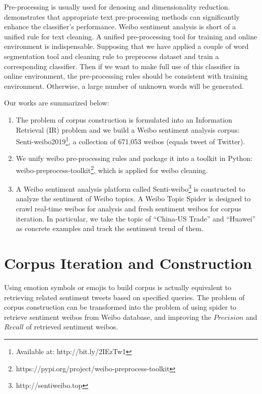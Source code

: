 \documentclass[runningheads]{llncs}
\begin{document}
Pre-processing is usually used for denosing and dimensionality reduction. \cite{haddi2013role} demonstrates that appropriate text pre-processing methods can significantly enhance the classifier's performance. Weibo sentiment analysis is short of a unified rule for text cleaning. A unified pre-processing tool for training and online environment is indispensable. Supposing that we have applied a couple of word segmentation tool and cleaning rule to preprocess dataset and train a corresponding classifier. Then if we want to make full use of this classifier in online environment, the pre-processing rules should be consistent with training environment. Otherwise, a large number of unknown words will be generated.

Our works are summarized below:
\begin{enumerate}
\item The problem of corpus construction is formulated into an Information Retrieval (IR) problem and we build a Weibo sentiment analysis corpus: Senti-weibo2019\footnote{Available at: http://bit.ly/2IEzTw1}, a collection of 671,053 weibos (equals tweet of Twitter).

\item We unify weibo pre-processing rules and package it into a toolkit in Python: weibo-preprocess-toolkit\footnote{https://pypi.org/project/weibo-preprocess-toolkit}, which is applied for weibo cleaning. 

\item A Weibo sentiment analysis platform called Senti-weibo\footnote{http://sentiweibo.top} is constructed to analyze the sentiment of Weibo topics. A Weibo Topic Spider is designed to crawl real-time weibos for analysis and fresh sentiment weibos for corpus iteration. In particular, we take the topic of ``China-US Trade'' and ``Huawei'' as concrete examples and track the sentiment trend of them.
\end{enumerate}


\section{Corpus Iteration and Construction}
Using emotion symbols or emojis to build corpus is actually equivalent to retrieving related sentiment tweets based on specified queries. The problem of corpus construction can be transformed into the problem of using spider to retrieve sentiment weibos from Weibo database, and improving the $Precision$ and $Recall$ of retrieved sentiment weibos. 
\end{document}
